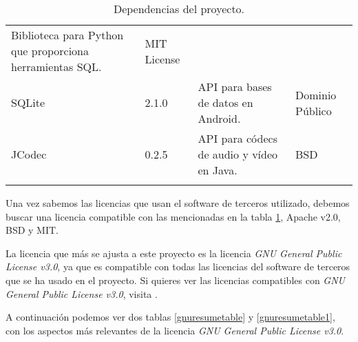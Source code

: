 \begin{longtable}[]{@{}llll@{}}
\begin{minipage}[t]{0.49\columnwidth}
Biblioteca para Python que proporciona herramientas SQL.\strut
\end{minipage} & \begin{minipage}[t]{0.11\columnwidth}\raggedright\strut
MIT License\strut
\end{minipage}\tabularnewline
\begin{minipage}[t]{0.18\columnwidth}\raggedright\strut
SQLite\strut
\end{minipage} & \begin{minipage}[t]{0.08\columnwidth}\raggedright\strut
2.1.0\strut
\end{minipage} & \begin{minipage}[t]{0.49\columnwidth}\raggedright\strut
API para bases de datos en Android.\strut
\end{minipage} & \begin{minipage}[t]{0.11\columnwidth}\raggedright\strut
Dominio Público\strut
\end{minipage}\tabularnewline
\begin{minipage}[t]{0.18\columnwidth}\raggedright\strut
JCodec\strut
\end{minipage} & \begin{minipage}[t]{0.08\columnwidth}\raggedright\strut
0.2.5\strut
\end{minipage} & \begin{minipage}[t]{0.49\columnwidth}\raggedright\strut
API para códecs de audio y vídeo en Java.\strut
\end{minipage} & \begin{minipage}[t]{0.11\columnwidth}\raggedright\strut
BSD\strut
\end{minipage}\tabularnewline
\bottomrule
\caption{Dependencias del proyecto.}
\label{librarylicensetable}
\end{longtable}

Una vez sabemos las licencias que usan el software de terceros utilizado, debemos buscar una licencia compatible con las mencionadas en la tabla \ref{librarylicensetable}, Apache v2.0, BSD y MIT.

La licencia que más se ajusta a este proyecto es la licencia \textit{GNU General Public License v3.0}, ya que es compatible con todas las licencias del software de terceros que se ha usado en el proyecto. 
Si quieres ver las licencias compatibles con \textit{GNU General Public License v3.0}, visita \cite{gnulicensecomp}.

A continuación podemos ver dos tablas \ref{gnuresumetable} y \ref{gnuresumetable1}, con los aspectos más relevantes de la licencia \textit{GNU General Public License v3.0}.


